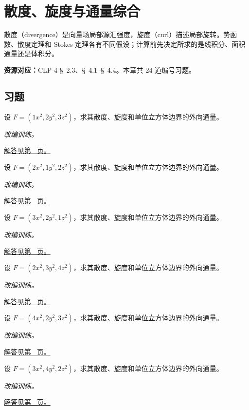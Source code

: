 \documentclass[UTF8,12pt,a4paper,fontset=fandol]{ctexart}
\begin{document}
\clearpage
\section{散度、旋度与通量综合}\label{sec:ch44}
散度（divergence）是向量场局部源汇强度，旋度（curl）描述局部旋转。势函数、散度定理和 Stokes 定理各有不同假设；计算前先决定所求的是线积分、面积通量还是体积分。

\textbf{资源对应：}CLP-4 \S~2.3、\S~4.1--\S~4.4。本章共 24 道编号习题。
\subsection{习题}
\begin{example}[立方体上的多项式通量]\label{ex:c44q1}
设 $F=(1x^2,2y^2,3z^2)$，求其散度、旋度和单位立方体边界的外向通量。
\par\textit{改编训练。}\par\hyperref[ans:c44q1]{解答见第~\pageref{ans:c44q1} 页。}
\end{example}
\begin{example}[立方体上的多项式通量]\label{ex:c44q2}
设 $F=(2x^2,1y^2,2z^2)$，求其散度、旋度和单位立方体边界的外向通量。
\par\textit{改编训练。}\par\hyperref[ans:c44q2]{解答见第~\pageref{ans:c44q2} 页。}
\end{example}
\begin{example}[立方体上的多项式通量]\label{ex:c44q3}
设 $F=(3x^2,2y^2,1z^2)$，求其散度、旋度和单位立方体边界的外向通量。
\par\textit{改编训练。}\par\hyperref[ans:c44q3]{解答见第~\pageref{ans:c44q3} 页。}
\end{example}
\begin{example}[立方体上的多项式通量]\label{ex:c44q4}
设 $F=(2x^2,3y^2,4z^2)$，求其散度、旋度和单位立方体边界的外向通量。
\par\textit{改编训练。}\par\hyperref[ans:c44q4]{解答见第~\pageref{ans:c44q4} 页。}
\end{example}
\begin{example}[立方体上的多项式通量]\label{ex:c44q5}
设 $F=(4x^2,2y^2,3z^2)$，求其散度、旋度和单位立方体边界的外向通量。
\par\textit{改编训练。}\par\hyperref[ans:c44q5]{解答见第~\pageref{ans:c44q5} 页。}
\end{example}
\begin{example}[立方体上的多项式通量]\label{ex:c44q6}
设 $F=(3x^2,4y^2,2z^2)$，求其散度、旋度和单位立方体边界的外向通量。
\par\textit{改编训练。}\par\hyperref[ans:c44q6]{解答见第~\pageref{ans:c44q6} 页。}
\end{example}
\end{document}
